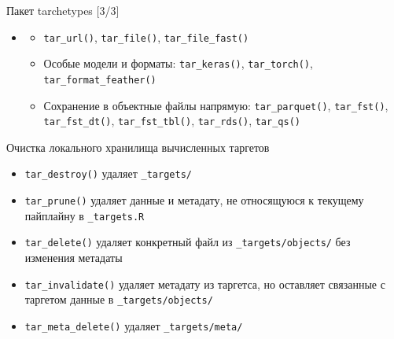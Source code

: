 \documentclass[
  ignorenonframetext,
]{beamer}
\begin{document}
\begin{frame}[fragile]{Пакет tarchetypes {[}3/3{]}}
\label{ux43fux430ux43aux435ux442-tarchetypes-33}
\begin{itemize}
\item
  \begin{itemize}
  \item
    \texttt{tar\_url()}, \texttt{tar\_file()},
    \texttt{tar\_file\_fast()}
  \item
    Особые модели и форматы: \texttt{tar\_keras()},
    \texttt{tar\_torch()}, \texttt{tar\_format\_feather()}
  \item
    Сохранение в объектные файлы напрямую: \texttt{tar\_parquet()},
    \texttt{tar\_fst()}, \texttt{tar\_fst\_dt()},
    \texttt{tar\_fst\_tbl()}, \texttt{tar\_rds()}, \texttt{tar\_qs()}
  \end{itemize}
\end{itemize}
\end{frame}

\begin{frame}[fragile]{Очистка локального хранилища вычисленных
таргетов}
\label{ux43eux447ux438ux441ux442ux43aux430-ux43bux43eux43aux430ux43bux44cux43dux43eux433ux43e-ux445ux440ux430ux43dux438ux43bux438ux449ux430-ux432ux44bux447ux438ux441ux43bux435ux43dux43dux44bux445-ux442ux430ux440ux433ux435ux442ux43eux432}
\begin{itemize}
\item
  \texttt{tar\_destroy()} удаляет \texttt{\_targets/}
\item
  \texttt{tar\_prune()} удаляет данные и метадату, не относящуюся к
  текущему пайплайну в \texttt{\_targets.R}
\item
  \texttt{tar\_delete()} удаляет конкретный файл из
  \texttt{\_targets/objects/} без изменения метадаты
\item
  \texttt{tar\_invalidate()} удаляет метадату из таргетса, но оставляет
  связанные с таргетом данные в \texttt{\_targets/objects/}
\item
  \texttt{tar\_meta\_delete()} удаляет \texttt{\_targets/meta/}
\end{itemize}
\end{frame}
\end{document}
